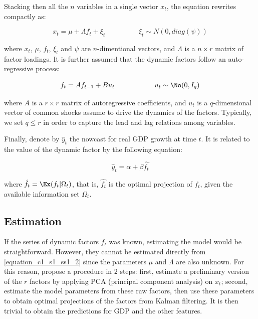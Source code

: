 Stacking then all the $n$ variables in a single vector $x_t$, the equation rewrites compactly as:

\begin{equation}
x_t = \mu + \Lambda f_t + \xi_t \hspace{2cm} \xi_t \sim N(0, diag(\psi))
\label{equation_c1_s1_ss1_2}
\end{equation}	

where $x_t$, $\mu$, $f_t$, $\xi_t$ and $\psi$ are $n$-dimentional vectors, and $\Lambda$ is a $n \times r$ matrix of factor loadings. It is further assumed that the dynamic factors follow an auto-regressive process:

\begin{equation}
f_t = A f_{t-1} + B u_t \hspace{2cm} u_t \sim \No(0, I_q)
\label{equation_c1_s1_ss1_3}
\end{equation}

where $A$ is a $r \times r$ matrix of autoregressive coefficients, and $u_t$ is a $q$-dimensional vector of common shocks assume to drive the dynamics of the factors. Typically, we set $q \leq r$ in order to capture the lead and lag relations among variables.

Finally, denote by $\hat{y}_t$ the nowcast for real GDP growth at time $t$. It is related to the value of the dynamic factor by the following equation:

\begin{equation}
\hat{y}_t = \alpha + \beta \hat{f_t}
\label{equation_c1_s1_ss1_4}
\end{equation}

where $\hat{f_t} = \Ex(f_t|\Omega_t)$, that is, $\hat{f_t}$ is the optimal projection of $f_t$, given the available information set $\Omega_t$.


\subsection{Estimation}
\label{chapter3_section1_subsection2}

If the series of dynamic factors $f_t$ was known, estimating the model would be straightforward. However, they cannot be estimated directly from \ref{equation_c1_s1_ss1_2} since the parameters $\mu$ and $\Lambda$ are also unknown. For this reason, \cite{Giannone2008} propose a procedure in 2 steps: first, estimate a preliminary version of the $r$ factors by applying PCA (principal component analysis) on $x_t$; second, estimate the model parameters from these raw factors, then use these parameters to obtain optimal projections of the factors from Kalman filtering. It is then trivial to obtain the predictions for GDP and the other features.

